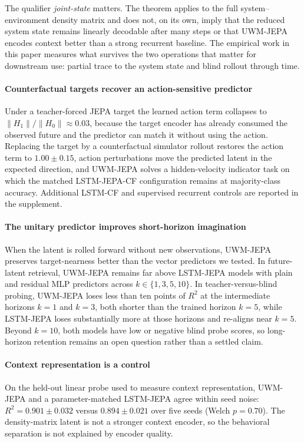 The qualifier \emph{joint-state} matters. The theorem applies to the
full system--environment density matrix and does not, on its own,
imply that the reduced system state remains linearly decodable after
many steps or that UWM-JEPA encodes context better than a strong
recurrent baseline. The empirical work in this paper measures what
survives the two operations that matter for downstream use: partial
trace to the system state and blind rollout through time.

\paragraph{Counterfactual targets recover an action-sensitive predictor}
Under a teacher-forced JEPA target the learned action term collapses to
$\|H_1\|/\|H_0\|\approx0.03$, because the target encoder has already
consumed the observed future and the predictor can match it without
using the action. Replacing the target by a counterfactual simulator
rollout restores the action term to $1.00\pm0.15$, action perturbations
move the predicted latent in the expected direction, and UWM-JEPA
solves a hidden-velocity indicator task on which the matched
LSTM-JEPA-CF configuration remains at majority-class accuracy.
Additional LSTM-CF and supervised recurrent controls are reported in
the supplement.

\paragraph{The unitary predictor improves short-horizon imagination}
When the latent is rolled forward without new observations, UWM-JEPA
preserves target-nearness better than the vector predictors we tested.
In future-latent retrieval, UWM-JEPA remains far above LSTM-JEPA models
with plain and residual MLP predictors across
$k\in\{1,3,5,10\}$. In teacher-versus-blind probing, UWM-JEPA loses
less than ten points of $R^2$ at the intermediate horizons $k=1$ and
$k=3$, both shorter than the trained horizon $k=5$, while LSTM-JEPA
loses substantially more at those horizons and re-aligns near $k=5$. Beyond $k=10$, both models
have low or negative blind probe scores, so long-horizon retention
remains an open question rather than a settled claim.

\paragraph{Context representation is a control}
On the held-out linear probe used to measure context representation,
UWM-JEPA and a parameter-matched LSTM-JEPA agree within seed noise:
$R^2=0.901\pm0.032$ versus $0.894\pm0.021$ over five seeds (Welch
$p=0.70$). The density-matrix latent is not a stronger context encoder,
so the behavioral separation is not explained by encoder quality.

